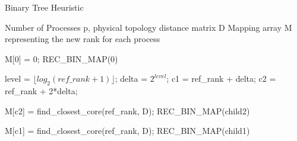 \begin{algorithm}
  \caption{Binary Tree Heuristic}
  \label{alg:bintree}
  \begin{algorithmic}[1]
    \Require Number of Processes p, physical topology distance matrix D
    \Ensure  Mapping array M representing the new rank for each process

    \State M[0] = 0;
    \State REC\_BIN\_MAP(0)

    \State level = $\lfloor log_2(ref\_rank + 1)\rfloor$;
    \State delta = $2^{level}$;
    \State c1 = ref\_rank + delta;
    \State c2 = ref\_rank + 2*delta;

    \State M[c2] = find\_closest\_core(ref\_rank, D);
    \State REC\_BIN\_MAP(child2)
    \EndIf

    \State M[c1] = find\_closest\_core(ref\_rank, D);
    \State REC\_BIN\_MAP(child1)
    \EndIf

    \EndProcedure
  \end{algorithmic}
\end{algorithm}
